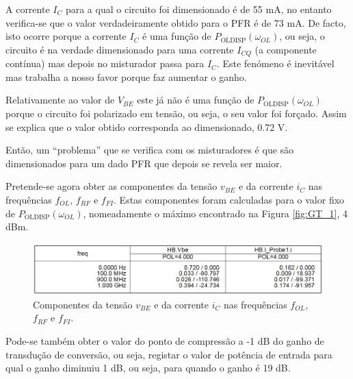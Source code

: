 \documentclass[11pt]{article}
\numberwithin{equation}{section}
\begin{document}
A corrente $I_{C}$ para a qual o circuito foi dimensionado é de 55 mA, no entanto verifica-se que o valor verdadeiramente obtido para o PFR é de 73 mA. De facto, isto ocorre porque a corrente $I_{C}$ é uma função de $ P_{\text{OLDISP}}\left(\omega_{OL}\right) $, ou seja, o circuito é na verdade dimensionado para uma corrente $I_{CQ}$ (a componente contínua) mas depois no misturador passa para $I_{C}$. Este fenómeno é inevitável mas trabalha a nosso favor porque faz aumentar o ganho.

Relativamente ao valor de $V_{BE}$ este já não é uma função de $ P_{\text{OLDISP}}\left(\omega_{OL}\right) $ porque o circuito foi polarizado em tensão, ou seja, o seu valor foi forçado. Assim se explica que o valor obtido corresponda ao dimensionado, 0.72 V.

Então, um ``problema'' que se verifica com os misturadores é que são dimensionados para um dado PFR que depois se revela ser maior.

Pretende-se agora obter as componentes da tensão $v_{BE}$ e da corrente $i_{C}$ nas frequências $f_{OL}$, $f_{RF}$ e $f_{FI}$. Estas componentes foram calculadas para o valor fixo de $ P_{\text{OLDISP}}\left(\omega_{OL}\right) $, nomeadamente o máximo encontrado na Figura \ref{fig:GT_1}, 4 dBm.


\begin{figure}[h]
\centering
\includegraphics[keepaspectratio=true, scale=0.50]{exps/Vbe_Ic}
\vspace{-0.5em}
\caption{Componentes da tensão $v_{BE}$ e da corrente $i_{C}$ nas frequências $f_{OL}$, $f_{RF}$ e $f_{FI}$.}
\vspace{-0.8em}
\end{figure}


Pode-se também obter o valor do ponto de compressão a -1 dB do ganho de transdução de conversão, ou seja, registar o valor de potência de entrada para qual o ganho diminuiu 1 dB, ou seja, para quando o ganho é 19 dB. 

\pagebreak
\end{document}
